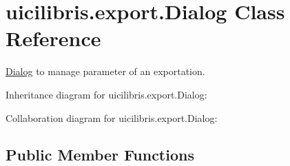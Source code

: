 \hypertarget{classuicilibris_1_1export_1_1Dialog}{\section{uicilibris.\-export.\-Dialog \-Class \-Reference}
\label{classuicilibris_1_1export_1_1Dialog}
}


\hyperlink{classuicilibris_1_1export_1_1Dialog}{\-Dialog} to manage parameter of an exportation.  




\-Inheritance diagram for uicilibris.\-export.\-Dialog\-:


\-Collaboration diagram for uicilibris.\-export.\-Dialog\-:
\subsection*{\-Public \-Member \-Functions}
